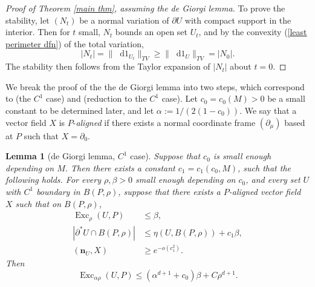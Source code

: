 \documentclass[reqno,11pt]{amsart}
\DeclareMathOperator{\Exc}{Exc}
\newcommand*\dif{\mathop{}\!\mathrm{d}}
\newcommand{\normal}{\mathbf n}
\newcommand{\dfn}[1]{\emph{#1}\index{#1}}
\newtheorem{lemma}[theorem]{Lemma}
\theoremstyle{definition}
\numberwithin{equation}{section}
\begin{document}
\begin{proof}[Proof of Theorem \ref{main thm}, assuming the de Giorgi lemma]
To prove the stability, let $(N_t)$ be a normal variation of $\partial U$ with compact support in the interior.
Then for $t$ small, $N_t$ bounds an open set $U_t$, and by the convexity (\ref{least perimeter dfn}) of the total variation,
$$|N_t| = \|\dif 1_{U_t}\|_{TV} \geq \|\dif 1_U\|_{TV} = |N_0|.$$
The stability then follows from the Taylor expansion of $|N_t|$ about $t = 0$.
\end{proof}

We break the proof of the the de Giorgi lemma into two steps, which correspond to \cite[Lemma 6.4]{Giusti77} (the $C^1$ case) and \cite[Lemma 7.5]{Giusti77} (reduction to the $C^1$ case).
Let $c_0 = c_0(M) > 0$ be a small constant to be determined later, and let $\alpha := 1/(2(1 - c_0))$.
We say that a vector field $X$ is $P$-\dfn{aligned} if there exists a normal coordinate frame $(\partial_\mu)$ based at $P$ such that $X = \partial_0$.

\begin{lemma}[de Giorgi lemma, $C^1$ case]\label{Miranda44}
Suppose that $c_0$ is small enough depending on $M$.
Then there exists a constant $c_1 = c_1(c_0, M)$, such that the following holds.
For every $\rho, \beta > 0$ small enough depending on $c_0$, and every set $U$ with $C^1$ boundary in $B(P, \rho)$, suppose that there exists a $P$-aligned vector field $X$ such that on $B(P, \rho)$,
\begin{align}
\Exc_\rho(U, P) &\leq \beta, \label{Miranda44 induction hyp}\\
|\partial^* U \cap B(P, \rho)| &\leq \eta(U, B(P, \rho)) + c_1 \beta, \label{Miranda44 minimality hyp} \\
(\normal_U, X) &\geq e^{-o(c_1^2)}. \label{Miranda44 normal hyp}
\end{align}
Then
\begin{equation}\label{Miranda44 concl}
\Exc_{\alpha \rho} (U, P) \leq (\alpha^{d + 1} + c_0) \beta + C\rho^{d + 1}.
\end{equation}
\end{lemma}
\end{document}
